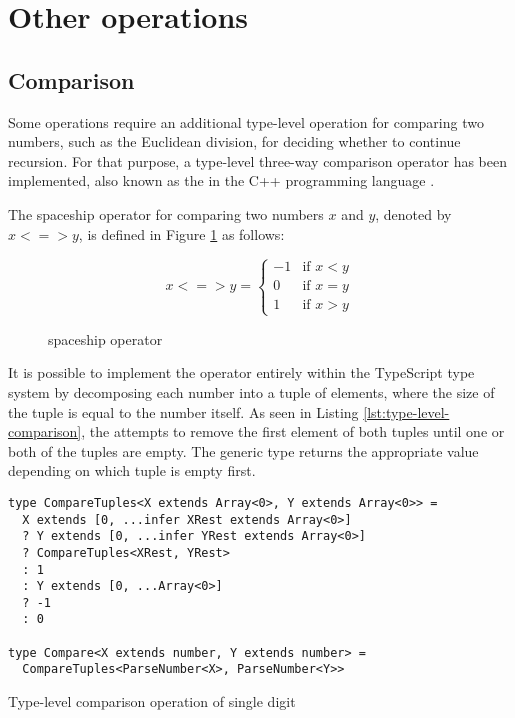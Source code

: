 \section{Other operations}

\subsection{Comparison}

Some operations require an additional type-level operation for comparing two numbers, such as the Euclidean division, for deciding whether to continue recursion. For that purpose, a type-level three-way comparison operator has been implemented, also known as the  in the C++ programming language \cite{sutterConsistentComparison2017}.

The spaceship operator for comparing two numbers $x$ and $y$, denoted by $x <=> y$, is defined in Figure \ref{fig:spaceship-operator} as follows:

\begin{figure}[ht]
  \begin{equation*}
    x <=> y =
    \begin{cases}
      -1 & \text{if } x < y \\
      0  & \text{if } x = y \\
      1  & \text{if } x > y
    \end{cases}
  \end{equation*}
  \caption{spaceship operator}\label{fig:spaceship-operator}
\end{figure}

It is possible to implement the operator entirely within the TypeScript type system by decomposing each number into a tuple of elements, where the size of the tuple is equal to the number itself. As seen in Listing \ref{lst:type-level-comparison}, the  attempts to remove the first element of both tuples until one or both of the tuples are empty. The generic type returns the appropriate value depending on which tuple is empty first.

\begin{listing}[ht]
  \begin{verbatim}
type CompareTuples<X extends Array<0>, Y extends Array<0>> =
  X extends [0, ...infer XRest extends Array<0>]
  ? Y extends [0, ...infer YRest extends Array<0>]
  ? CompareTuples<XRest, YRest>
  : 1
  : Y extends [0, ...Array<0>]
  ? -1
  : 0

type Compare<X extends number, Y extends number> =
  CompareTuples<ParseNumber<X>, ParseNumber<Y>>
\end{verbatim}
  \caption{Type-level comparison operation of single digit}\label{lst:type-level-comparison}
\end{listing}

